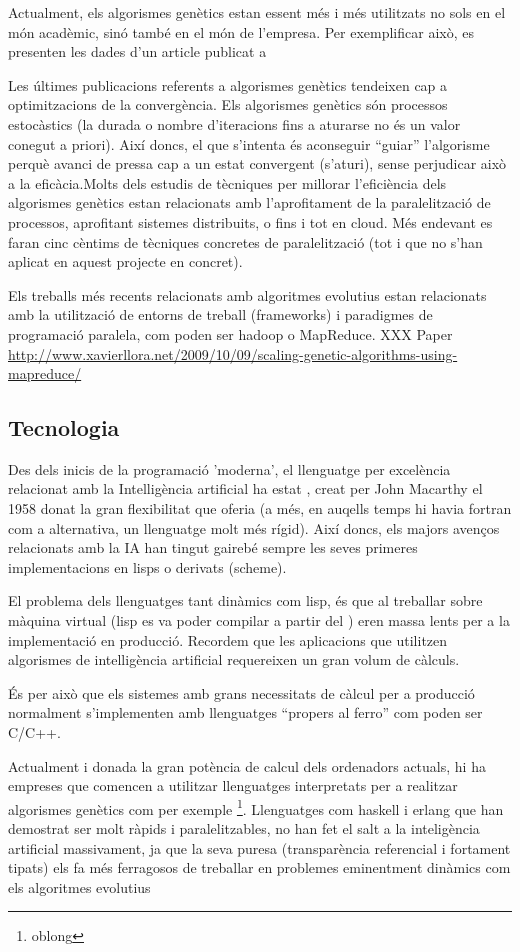 \documentclass[a4paper]{article}
\begin{document}
Actualment, els algorismes genètics estan essent més i més utilitzats no sols en
el món acadèmic, sinó també en el món de l'empresa.  Per exemplificar això, es
presenten les dades d'un article publicat a 

Les últimes publicacions referents a algorismes genètics tendeixen cap a
optimitzacions de la convergència.  Els algorismes genètics són processos
estocàstics (la durada o nombre d'iteracions fins a aturarse no és un valor
conegut a priori).  Així doncs, el que s'intenta és aconseguir ``guiar''
l'algorisme perquè avanci de pressa cap a un estat convergent (s'aturi), sense
perjudicar això a la eficàcia.Molts dels estudis de tècniques per millorar
l'eficiència dels algorismes genètics estan relacionats amb l'aprofitament de la
paralelització de processos, aprofitant sistemes distribuits, o fins i tot en
cloud.  Més endevant es faran cinc cèntims de tècniques concretes de
paralelització (tot i que no s'han aplicat en aquest projecte en concret).

Els treballs més recents relacionats amb algoritmes evolutius estan relacionats
amb la utilització de entorns de treball (frameworks) i paradigmes de
programació paralela, com poden ser hadoop o MapReduce. XXX Paper 
\url{http://www.xavierllora.net/2009/10/09/scaling-genetic-algorithms-using-mapreduce/}

\subsection{Tecnologia} %
\label{sub:Tecnologia}

Des dels inicis de la programació 'moderna', el llenguatge per excelència
relacionat amb la Intelligència artificial ha estat \cite{LISP}, creat per John
Macarthy el 1958 donat la gran flexibilitat que oferia (a més, en auqells temps
hi havia fortran com a alternativa, un llenguatge molt més rígid).  Així doncs,
els majors avenços relacionats amb la IA han tingut gairebé sempre les seves
primeres implementacions en lisps o derivats (scheme).  

El problema dels llenguatges tant dinàmics com lisp, és que al treballar sobre
màquina virtual (lisp es va poder compilar a partir del %
) eren massa lents per a la implementació en producció.  Recordem que les
aplicacions que utilitzen algorismes de intelligència artificial requereixen un
gran volum de càlculs.

És per això que els sistemes amb grans necessitats de càlcul per a producció
normalment s'implementen amb llenguatges ``propers al ferro'' com poden ser
C/C++. 

Actualment i donada la gran potència de calcul dels ordenadors actuals, hi ha
empreses que comencen a utilitzar llenguatges interpretats per a realitzar
algorismes genètics  com per exemple \footnote{oblong}.  Llenguatges com haskell
i erlang que han demostrat ser molt ràpids i paralelitzables, no han fet el salt
a la inteligència artificial massivament, ja que la seva puresa (transparència
referencial i fortament tipats) els fa més ferragosos de treballar en problemes
eminentment dinàmics com els algoritmes evolutius  


\end{document}
